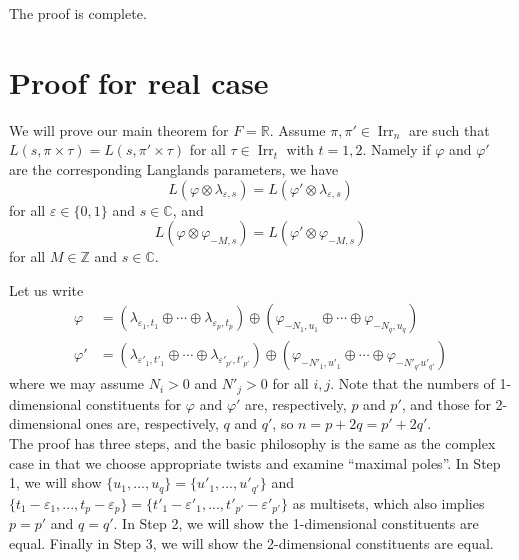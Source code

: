 \documentclass[11pt]{amsart}
\theoremstyle{plain}
\theoremstyle{definition}
\numberwithin{equation}{section}
\newcommand{\C}{\mathbb C}
\newcommand{\Z}{\mathbb{Z}}
\newcommand{\R}{\mathbb{R}}
\newcommand{\la}{\lambda}
\newcommand{\ep}{\varepsilon}
\newcommand{\Irr}{\operatorname{Irr}}
\begin{document}
The proof is complete.




\section{Proof for real case}



We will prove our main theorem for $F=\R$. Assume $\pi, \pi'\in\Irr_n$ are
such that $L(s, \pi\times\tau)=L(s,\pi'\times\tau)$ for all
$\tau\in\Irr_t$ with $t=1,2$. Namely if
$\varphi$ and $\varphi'$ are the corresponding Langlands parameters,
we have
\begin{equation}\label{E:character-twist}
L(\varphi\otimes\la_{\ep,s})=L(\varphi'\otimes\la_{\ep,s})
\end{equation}
for all $\ep\in\{0,1\}$ and $s\in\C$, and 
\begin{equation}\label{E:GL(2)-twist}
L(\varphi\otimes\varphi_{-M,s})=L(\varphi'\otimes\varphi_{-M,s})
\end{equation}
for all $M\in\Z$ and $s\in\C$. 

Let us write 
\begin{align*}
\varphi&=\left(\la_{\ep_1,t_1}\oplus\cdots\oplus\la_{\ep_p,t_p}\right)\oplus
\left(\varphi_{-N_1,u_1}\oplus\cdots\oplus\varphi_{-N_q, u_q}\right)\\
\varphi'&=\left(\la_{\ep'_1,t'_1}\oplus\cdots\oplus\la_{\ep'_{p'},t'_{p'}}\right)\oplus
\left(\varphi_{-N'_1,u'_1}\oplus\cdots\oplus\varphi_{-N'_{q'} u'_{q'}}\right)
\end{align*}
where we may assume $N_i>0$ and $N'_j>0$ for all $i, j$. Note that
the numbers of 1-dimensional constituents for $\varphi$ and $\varphi'$
are, respectively, $p$ and $p'$, and those for 2-dimensional ones are,
respectively, $q$ and $q'$, so $n=p+2q=p'+2q'$.\\

The proof has three steps, and the basic philosophy is the same as the
complex case in that we choose appropriate twists and examine
``maximal poles''. In Step 1, we will show $\{u_1, ..., u_q\}=\{u'_1, ..., u'_{q'} \}$ and 
$\{t_1-\ep_1, ..., t_p-\ep_p\}=\{t'_1-\ep'_1, ..., t'_{p'}-\ep'_{p'}\}$ as multisets, which also implies $p=p'$ and
$q=q'$. In Step 2, we will show
the 1-dimensional constituents are equal. Finally in Step 3, we will show
the 2-dimensional constituents are equal.
\end{document}
